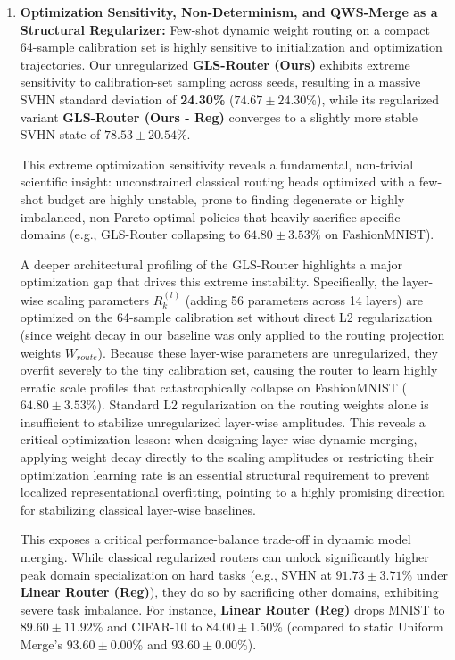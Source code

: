 \begin{enumerate}
    \item \textbf{Optimization Sensitivity, Non-Determinism, and QWS-Merge as a Structural Regularizer:} Few-shot dynamic weight routing on a compact 64-sample calibration set is highly sensitive to initialization and optimization trajectories. Our unregularized \textbf{GLS-Router (Ours)} exhibits extreme sensitivity to calibration-set sampling across seeds, resulting in a massive SVHN standard deviation of \textbf{24.30\%} ($74.67 \pm 24.30$\%), while its regularized variant \textbf{GLS-Router (Ours - Reg)} converges to a slightly more stable SVHN state of $78.53 \pm 20.54$\%.

    This extreme optimization sensitivity reveals a fundamental, non-trivial scientific insight: unconstrained classical routing heads optimized with a few-shot budget are highly unstable, prone to finding degenerate or highly imbalanced, non-Pareto-optimal policies that heavily sacrifice specific domains (e.g., GLS-Router collapsing to $64.80 \pm 3.53$\% on FashionMNIST).

    A deeper architectural profiling of the GLS-Router highlights a major optimization gap that drives this extreme instability. Specifically, the layer-wise scaling parameters $R_k^{(l)}$ (adding 56 parameters across 14 layers) are optimized on the 64-sample calibration set without direct L2 regularization (since weight decay in our baseline was only applied to the routing projection weights $W_{route}$). Because these layer-wise parameters are unregularized, they overfit severely to the tiny calibration set, causing the router to learn highly erratic scale profiles that catastrophically collapse on FashionMNIST ($64.80 \pm 3.53$\%). Standard L2 regularization on the routing weights alone is insufficient to stabilize unregularized layer-wise amplitudes. This reveals a critical optimization lesson: when designing layer-wise dynamic merging, applying weight decay directly to the scaling amplitudes or restricting their optimization learning rate is an essential structural requirement to prevent localized representational overfitting, pointing to a highly promising direction for stabilizing classical layer-wise baselines.

    This exposes a critical performance-balance trade-off in dynamic model merging. While classical regularized routers can unlock significantly higher peak domain specialization on hard tasks (e.g., SVHN at $91.73 \pm 3.71$\% under \textbf{Linear Router (Reg)}), they do so by sacrificing other domains, exhibiting severe task imbalance. For instance, \textbf{Linear Router (Reg)} drops MNIST to $89.60 \pm 11.92$\% and CIFAR-10 to $84.00 \pm 1.50$\% (compared to static Uniform Merge's $93.60 \pm 0.00$\% and $93.60 \pm 0.00$\%).


\end{enumerate}
